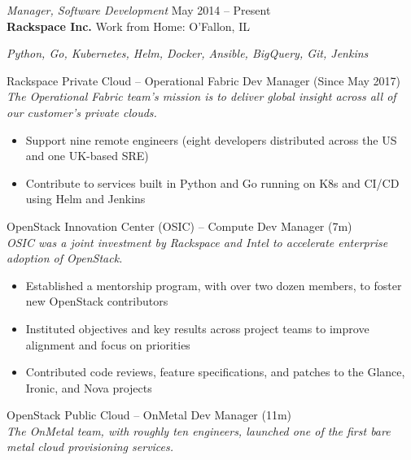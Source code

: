 \documentclass[margin,line]{resume}
\begin{document}
\begin{resume}
{\sl Manager, Software Development} \hfill
     May 2014 -- Present\\
     \textbf{Rackspace Inc.} \hfill
     Work from Home: O'Fallon, IL\\[4pt]
{\small\centering\textit{Python, Go, Kubernetes, Helm, Docker, Ansible, BigQuery, Git, Jenkins}\par}\vspace*{-\baselineskip}
\vspace{4pt}
{\small Rackspace Private Cloud -- Operational Fabric  \hfill  Dev Manager (Since May 2017)}\\
{\small\textit{The Operational Fabric team's mission is to deliver global insight across all of our customer's private clouds.}}
\begin{itemize} \itemsep -2pt %
\small\item Support nine remote engineers (eight developers distributed across the US and one UK-based SRE)
\small\item Contribute to services built in Python and Go running on K8s and CI/CD using Helm and Jenkins
\end{itemize}\vspace*{-\baselineskip} %
\vspace{4pt}
{\small OpenStack Innovation Center (OSIC) -- Compute  \hfill  Dev Manager (7m)}\\
{\small\textit{OSIC was a joint investment by Rackspace and Intel to accelerate enterprise adoption of OpenStack.}}
\begin{itemize} \itemsep -2pt %
\small\item Established a mentorship program, with over two dozen members, to foster new OpenStack contributors
\small\item Instituted objectives and key results across project teams to improve alignment and focus on priorities
\small\item Contributed code reviews, feature specifications, and patches to the Glance, Ironic, and Nova projects
\end{itemize}\vspace*{-\baselineskip} %
\vspace{4pt}
{\small OpenStack Public Cloud -- OnMetal  \hfill  Dev Manager (11m)}\\
{\small\textit{The OnMetal team, with roughly ten engineers, launched one of the first bare metal cloud provisioning services.}}
\begin{itemize} \itemsep -2pt %

\end{itemize}
\end{resume}
\end{document}
